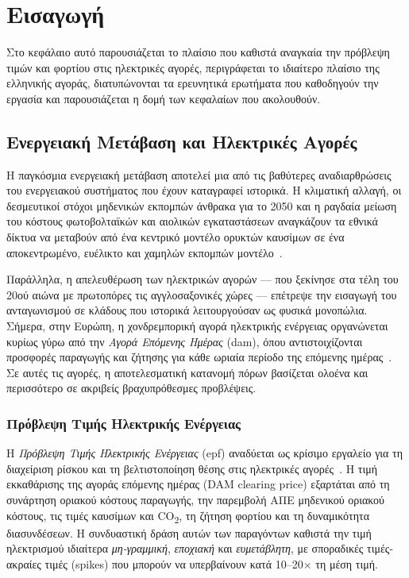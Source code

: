 \chapter{Εισαγωγή}
\label{ch:intro}

Στο κεφάλαιο αυτό παρουσιάζεται το πλαίσιο που καθιστά αναγκαία την πρόβλεψη τιμών και
φορτίου στις ηλεκτρικές αγορές, περιγράφεται το ιδιαίτερο πλαίσιο της ελληνικής αγοράς,
διατυπώνονται τα ερευνητικά ερωτήματα που καθοδηγούν την εργασία και παρουσιάζεται
η δομή των κεφαλαίων που ακολουθούν.

\section{Ενεργειακή Μετάβαση και Ηλεκτρικές Αγορές}
\label{sec:energy_transition}

Η παγκόσμια ενεργειακή μετάβαση αποτελεί μια από τις βαθύτερες αναδιαρθρώσεις του
ενεργειακού συστήματος που έχουν καταγραφεί ιστορικά. Η κλιματική αλλαγή, οι
δεσμευτικοί στόχοι μηδενικών εκπομπών άνθρακα για το 2050 και η ραγδαία μείωση του
κόστους φωτοβολταϊκών και αιολικών εγκαταστάσεων αναγκάζουν τα εθνικά δίκτυα να
μεταβούν από ένα κεντρικό μοντέλο ορυκτών καυσίμων σε ένα αποκεντρωμένο,
ευέλικτο και χαμηλών εκπομπών μοντέλο~\cite{weron2014electricity}.

Παράλληλα, η απελευθέρωση των ηλεκτρικών αγορών — που ξεκίνησε στα τέλη του 20ού
αιώνα με πρωτοπόρες τις αγγλοσαξονικές χώρες — επέτρεψε την εισαγωγή του
ανταγωνισμού σε κλάδους που ιστορικά λειτουργούσαν ως φυσικά μονοπώλια. Σήμερα,
στην Ευρώπη, η χονδρεμπορική αγορά ηλεκτρικής ενέργειας οργανώνεται κυρίως γύρω
από την \textit{Αγορά Επόμενης Ημέρας} (\gls{dam}), όπου αντιστοιχίζονται προσφορές
παραγωγής και ζήτησης για κάθε ωριαία περίοδο της επόμενης
ημέρας~\cite{cacm2015}. Σε αυτές τις αγορές, η αποτελεσματική κατανομή πόρων
βασίζεται ολοένα και περισσότερο σε ακριβείς βραχυπρόθεσμες προβλέψεις.

\subsection*{Πρόβλεψη Τιμής Ηλεκτρικής Ενέργειας}

Η \textit{Πρόβλεψη Τιμής Ηλεκτρικής Ενέργειας} (\gls{epf}) αναδύεται ως κρίσιμο
εργαλείο για τη διαχείριση ρίσκου και τη βελτιστοποίηση θέσης στις ηλεκτρικές
αγορές~\cite{lago2021}. Η τιμή εκκαθάρισης της αγοράς επόμενης ημέρας (DAM
clearing price) εξαρτάται από τη συνάρτηση οριακού κόστους παραγωγής, την παρεμβολή
ΑΠΕ μηδενικού οριακού κόστους, τις τιμές καυσίμων και CO\textsubscript{2}, τη
ζήτηση φορτίου και τη δυναμικότητα διασυνδέσεων. Η συνδυαστική δράση αυτών των
παραγόντων καθιστά την τιμή ηλεκτρισμού ιδιαίτερα \textit{μη-γραμμική},
\textit{εποχιακή} και \textit{ευμετάβλητη}, με σποραδικές τιμές-ακραίες τιμές
(spikes) που μπορούν να υπερβαίνουν κατά 10--20× τη μέση τιμή.

